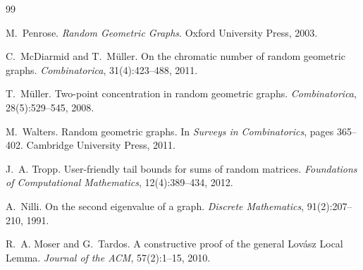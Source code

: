 \documentclass[11pt]{article}
\theoremstyle{definition}
\begin{document}
\begin{thebibliography}{99}

M.~Penrose.
\newblock \textit{Random Geometric Graphs}.
\newblock Oxford University Press, 2003.

C.~McDiarmid and T.~M\"uller.
\newblock On the chromatic number of random geometric graphs.
\newblock \textit{Combinatorica}, 31(4):423--488, 2011.

T.~M\"uller.
\newblock Two-point concentration in random geometric graphs.
\newblock \textit{Combinatorica}, 28(5):529--545, 2008.

M.~Walters.
\newblock Random geometric graphs.
\newblock In \textit{Surveys in Combinatorics}, pages 365--402.
  Cambridge University Press, 2011.

J.~A. Tropp.
\newblock User-friendly tail bounds for sums of random matrices.
\newblock \textit{Foundations of Computational Mathematics},
  12(4):389--434, 2012.

A.~Nilli.
\newblock On the second eigenvalue of a graph.
\newblock \textit{Discrete Mathematics}, 91(2):207--210, 1991.

R.~A. Moser and G.~Tardos.
\newblock A constructive proof of the general {Lov\'asz Local Lemma}.
\newblock \textit{Journal of the ACM}, 57(2):1--15, 2010.

\end{thebibliography}
\end{document}
